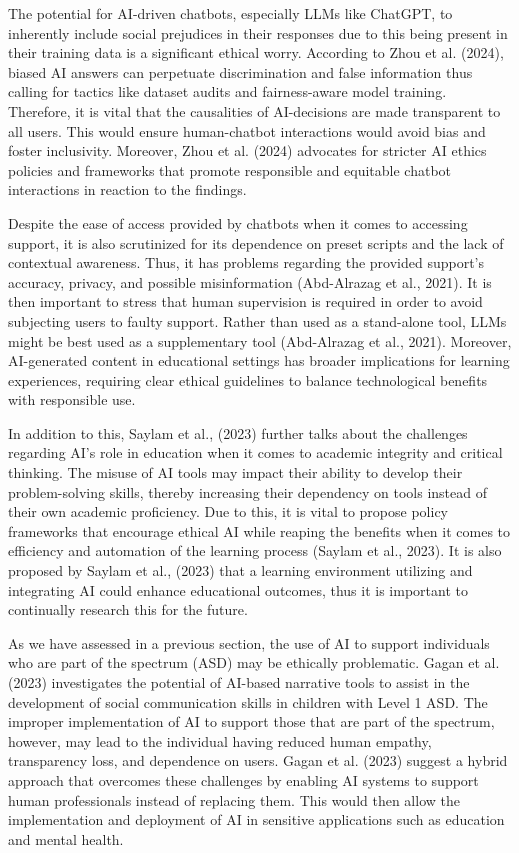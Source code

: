 The potential for AI-driven chatbots, especially LLMs like ChatGPT, to inherently include social prejudices in their responses due to this being present in their training data is a significant ethical worry. According to Zhou et al. (2024), biased AI answers can perpetuate discrimination and false information thus calling for tactics like dataset audits and fairness-aware model training. Therefore, it is vital that the causalities of AI-decisions are made transparent to all users. This would ensure human-chatbot interactions would avoid bias and foster inclusivity. Moreover, Zhou et al. (2024) advocates for stricter AI ethics policies and frameworks that promote responsible and equitable chatbot interactions in reaction to the findings.

Despite the ease of access provided by chatbots when it comes to accessing support, it is also scrutinized for its dependence on preset scripts and the lack of contextual awareness. Thus, it has problems regarding the provided support’s accuracy, privacy, and possible misinformation (Abd-Alrazag et al., 2021). It is then important to stress that human supervision is required in order to avoid subjecting users to faulty support. Rather than used as a stand-alone tool, LLMs might be best used as a supplementary tool (Abd-Alrazag et al., 2021). Moreover, AI-generated content in educational settings has broader implications for learning experiences, requiring clear ethical guidelines to balance technological benefits with responsible use. 

In addition to this, Saylam et al., (2023) further talks about the challenges regarding AI’s role in education when it comes to academic integrity and critical thinking. The misuse of AI tools may impact their ability to develop their problem-solving skills, thereby increasing their dependency on tools instead of their own academic proficiency. Due to this, it is vital to propose policy frameworks that encourage ethical AI while reaping the benefits when it comes to efficiency and automation of the learning process (Saylam et al., 2023). It is also proposed by Saylam et al., (2023) that a learning environment utilizing and integrating AI could enhance educational outcomes, thus it is important to continually research this for the future. 

As we have assessed in a previous section, the use of AI to support individuals who are part of the spectrum (ASD) may be ethically problematic. Gagan et al. (2023) investigates the potential of AI-based narrative tools to assist in the development of social communication skills in children with Level 1 ASD. The improper implementation of AI to support those that are part of the spectrum, however, may lead to the individual having reduced human empathy, transparency loss, and dependence on users. Gagan et al. (2023) suggest a hybrid approach that overcomes these challenges by enabling AI systems to support human professionals instead of replacing them. This would then allow the implementation and deployment of AI in sensitive applications such as education and mental health.

